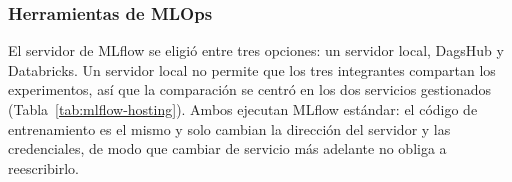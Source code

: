 \subsubsection{Herramientas de MLOps}\label{sec:mlops-tools}
El servidor de MLflow se eligió entre tres opciones: un servidor local,
DagsHub y Databricks. Un servidor local no permite que los tres integrantes
compartan los experimentos, así que la comparación se centró en los dos
servicios gestionados (Tabla~\ref{tab:mlflow-hosting}). Ambos ejecutan MLflow
estándar: el código de entrenamiento es el mismo y solo cambian la dirección
del servidor y las credenciales, de modo que cambiar de servicio más adelante
no obliga a reescribirlo.

